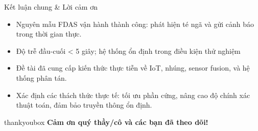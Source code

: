 \begin{frame}{Kết luận chung \& Lời cảm ơn}
\begin{itemize}
    \item Nguyên mẫu FDAS vận hành thành công: phát hiện té ngã và gửi cảnh báo trong thời gian thực.
    \item Độ trễ đầu-cuối < 5 giây; hệ thống ổn định trong điều kiện thử nghiệm
    \item Đề tài đã cung cấp kiến thức thực tiễn về IoT, nhúng, sensor fusion, và hệ thống phân tán.
    \item Xác định các thách thức thực tế: tối ưu phần cứng, nâng cao độ chính xác thuật toán, đảm bảo truyền thông ổn định.
\end{itemize}

\vspace{1em}
\begin{center}
    \begin{beamercolorbox}[rounded=true,shadow=true,center,wd=\linewidth]{thankyoubox}
        \textbf{\LARGE Cảm ơn quý thầy/cô và các bạn đã theo dõi!}
    \end{beamercolorbox}
\end{center}
\end{frame}
